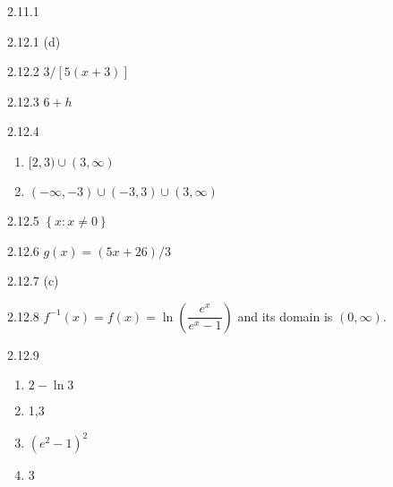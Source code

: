 \begin{Answer}{2.11.1}
	
\end{Answer}
\begin{Answer}{2.12.1}
	(d)
\end{Answer}
\begin{Answer}{2.12.2}
	$3/\left[5(x+3)\right]$
\end{Answer}
\begin{Answer}{2.12.3}
	$6+h$
\end{Answer}
\begin{Answer}{2.12.4}
\begin{enumerate}
	\item	$[2,3)\cup(3,\infty)$
	\item	$(-\infty,-3)\cup(-3,3)\cup(3,\infty)$
\end{enumerate}
\end{Answer}
\begin{Answer}{2.12.5}
	$\left\{x:x\neq 0\right\}$
\end{Answer}
\begin{Answer}{2.12.6}
	$g(x)=(5x+26)/3$
\end{Answer}
\begin{Answer}{2.12.7}
	(c)
\end{Answer}
\begin{Answer}{2.12.8}
	$f^{-1}(x)=f(x)=\ln\left(\dfrac{e^x}{e^x-1}\right)$ and its domain is $(0,\infty)$.
\end{Answer}
\begin{Answer}{2.12.9}
\begin{enumerate}
	\item	$2-\ln 3$
	\item	1,3
	\item	$(e^2-1)^2$
	\item	3
\end{enumerate}
\end{Answer}
